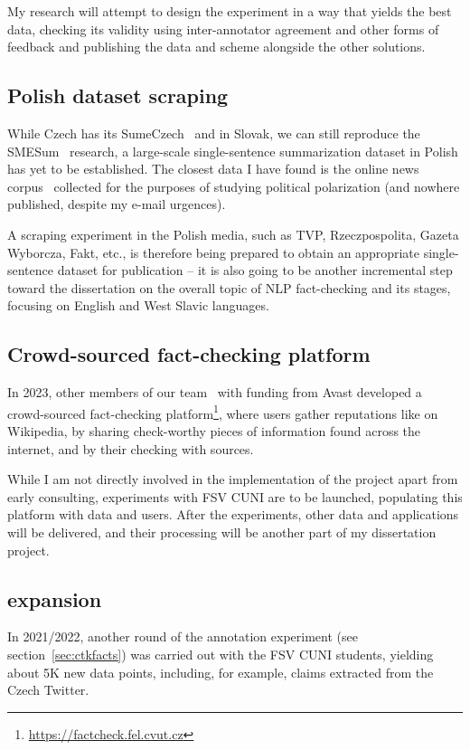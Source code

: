 My research will attempt to design the experiment in a way that yields the best data, checking its validity using inter-annotator agreement and other forms of feedback and publishing the data and scheme alongside the other solutions.

\subsection{Polish dataset scraping}
While Czech has its SumeCzech~\cite{straka-etal-2018-sumeczech} and in Slovak, we can still reproduce the SMESum~\cite{suppa-adamec-2020-summarization} research, a large-scale single-sentence summarization dataset in Polish has yet to be established.
The closest data I have found is the online news corpus~\cite{szwoch-etal-2022-creation} collected for the purposes of studying political polarization (and nowhere published, despite my e-mail urgences).

A scraping experiment in the Polish media, such as TVP, Rzeczpospolita, Gazeta Wyborcza, Fakt, etc., is therefore being prepared to obtain an appropriate single-sentence dataset for publication -- it is also going to be another incremental step toward the dissertation on the overall topic of NLP fact-checking and its stages, focusing on English and West Slavic languages. 

\subsection{Crowd-sourced fact-checking platform}
In 2023, other members of our team~\cite{butora} with funding from Avast developed a crowd-sourced fact-checking platform\footnote{\url{https://factcheck.fel.cvut.cz}}, where users gather reputations like on Wikipedia, by sharing check-worthy pieces of information found across the internet, and by their checking with sources.

While I am not directly involved in the implementation of the project apart from early consulting, experiments with FSV CUNI are to be launched, populating this platform with data and users. 
After the experiments, other data and applications will be delivered, and their processing will be another part of my dissertation project.

\subsection{\CTK expansion}
In 2021/2022, another round of the \CTK annotation experiment (see section~\ref{sec:ctkfacts}) was carried out with the FSV CUNI students, yielding about 5K new data points, including, for example, claims extracted from the Czech Twitter.

